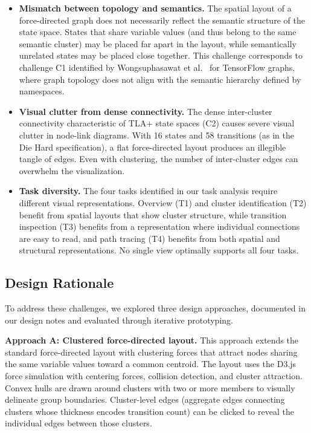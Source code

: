 \documentclass[conference]{IEEEtran}
\begin{document}
\begin{itemize}
\item[\textbf{D1.}] \textbf{Mismatch between topology and semantics.} The spatial layout of a force-directed graph does not necessarily reflect the semantic structure of the state space. States that share variable values (and thus belong to the same semantic cluster) may be placed far apart in the layout, while semantically unrelated states may be placed close together. This challenge corresponds to challenge C1 identified by Wongsuphasawat et al.~\cite{wongsuphasawat2018tensorflow} for TensorFlow graphs, where graph topology does not align with the semantic hierarchy defined by namespaces.

\item[\textbf{D2.}] \textbf{Visual clutter from dense connectivity.} The dense inter-cluster connectivity characteristic of TLA+ state spaces (C2) causes severe visual clutter in node-link diagrams. With 16 states and 58 transitions (as in the Die Hard specification), a flat force-directed layout produces an illegible tangle of edges. Even with clustering, the number of inter-cluster edges can overwhelm the visualization.

\item[\textbf{D3.}] \textbf{Task diversity.} The four tasks identified in our task analysis require different visual representations. Overview (T1) and cluster identification (T2) benefit from spatial layouts that show cluster structure, while transition inspection (T3) benefits from a representation where individual connections are easy to read, and path tracing (T4) benefits from both spatial and structural representations. No single view optimally supports all four tasks.
\end{itemize}

\subsection{Design Rationale}

To address these challenges, we explored three design approaches, documented in our design notes and evaluated through iterative prototyping.

\textbf{Approach A: Clustered force-directed layout.} This approach extends the standard force-directed layout with clustering forces that attract nodes sharing the same variable values toward a common centroid. The layout uses the D3.js force simulation with centering forces, collision detection, and cluster attraction. Convex hulls are drawn around clusters with two or more members to visually delineate group boundaries. Cluster-level edges (aggregate edges connecting clusters whose thickness encodes transition count) can be clicked to reveal the individual edges between those clusters.
\end{document}
